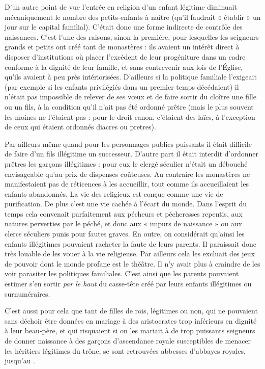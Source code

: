  D'un autre point de vue l'entrée en religion d'un enfant légitime diminuait mécaniquement le nombre des petits-enfants à naître (qu'il faudrait « établir » un jour sur le capital familial). C'était donc une forme indirecte de contrôle des naissances. C'est l'une des raisons, sinon la première, pour lesquelles les seigneurs grands et petits ont créé tant de monastères : ils avaient un intérêt direct à disposer d'institutions où placer l'excédent de leur progéniture dans un cadre conforme à la dignité de leur famille, et sans contrevenir aux lois de l'Église, qu'ils avaient à peu près intériorisées. D'ailleurs si la politique familiale l'exigeait (par exemple si les enfants privilégiés dans un premier temps décédaient) il n'était pas impossible de relever de ses vœux et de faire sortir du cloître une fille ou un fils, à la condition qu'il n'ait pas été ordonné prêtre (mais le plus souvent les moines ne l'étaient pas : pour le droit canon, c'étaient des laïcs, à l'exception de ceux qui étaient ordonnés diacres ou pretres).

 Par ailleurs même quand pour les personnages publics puissants il était difficile de faire d'un fils illégitime un successeur. D'autre part il était interdit d'ordonner prêtres les garçons illégitimes : pour eux le clergé séculier n'était un débouché envisageable qu'au prix de dispenses coûteuses. Au contraire les monastères ne manifestaient pas de réticences à les accueillir, tout comme ils accueillaient les enfants abandonnés. La vie des religieux est conçue comme une vie de purification. De plus c'est une vie cachée à l'écart du monde. Dans l'esprit du temps cela convenait parfaitement aux pécheurs et pécheresses repentis, aux natures perverties par le péché, et donc aux « impurs de naissance » ou aux clercs séculiers punis pour fautes graves. En outre, on considérait qu'ainsi les enfants illégitimes pouvaient racheter la faute de leurs parents. Il paraissait donc très louable de les vouer à la vie religieuse. Par ailleurs cela les excluait des jeux de pouvoir dont le monde profane est le théâtre. Il n'y avait plus à craindre de les voir parasiter les politiques familiales. C'est ainsi que les parents pouvaient estimer s'en sortir \emph{par le haut} du casse-tête créé par leurs enfants illégitimes ou surnuméraires.
 
 C'est aussi pour cela que tant de filles de rois, légitimes ou non, qui ne pouvaient sans déchoir être données en mariage à des aristocrates trop inférieurs en dignité à leur beau-père, et qui risquaient si on les mariait à de trop puissants seigneurs de donner naissance à des garçons d'ascendance royale susceptibles de menacer les héritiers légitimes du trône, se sont retrouvées abbesses d'abbayes royales, jusqu'au . 

